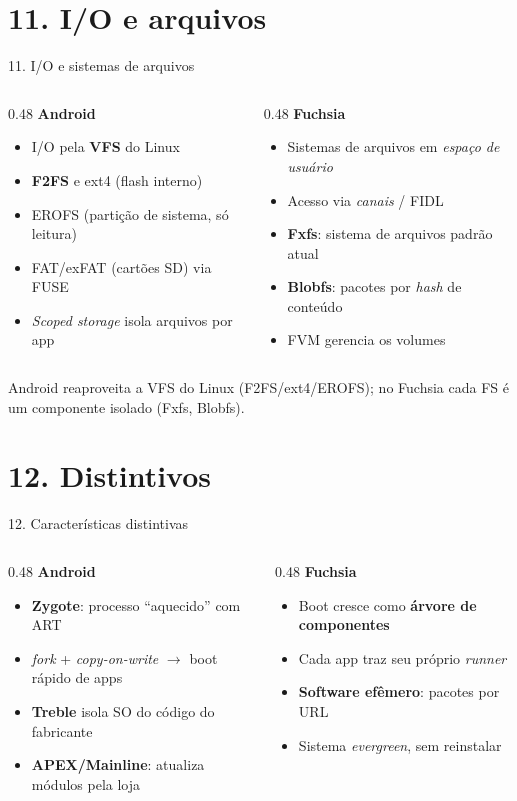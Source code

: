 \documentclass[aspectratio=169,11pt]{beamer}
\newcommand{\ANDROID}{\textbf{\color{androidVerde}Android}}
\newcommand{\FUCHSIA}{\textbf{\color{fuchsiaCor}Fuchsia}}
\newcommand{\comparar}[2]{%
  \begin{columns}[T,onlytextwidth]
    \begin{column}{0.48\textwidth}
      \ANDROID\par\smallskip
      \begin{itemize}\footnotesize #1 \end{itemize}
    \end{column}
    \begin{column}{0.48\textwidth}
      \FUCHSIA\par\smallskip
      \begin{itemize}\footnotesize #2 \end{itemize}
    \end{column}
  \end{columns}%
}
\begin{document}
\section{11. I/O e arquivos}

\begin{frame}{11. I/O e sistemas de arquivos}
  \comparar{
    \item I/O pela \textbf{VFS} do Linux
    \item \textbf{F2FS} e ext4 (flash interno)
    \item EROFS (partição de sistema, só leitura)
    \item FAT/exFAT (cartões SD) via FUSE
    \item \emph{Scoped storage} isola arquivos por app
  }{
    \item Sistemas de arquivos em \emph{espaço de usuário}
    \item Acesso via \emph{canais} / FIDL
    \item \textbf{Fxfs}: sistema de arquivos padrão atual
    \item \textbf{Blobfs}: pacotes por \emph{hash} de conteúdo
    \item FVM gerencia os volumes
  }
  \vfill
  {\scriptsize\color{gray} Android reaproveita a VFS do Linux (F2FS/ext4/EROFS); no Fuchsia cada FS é um componente isolado (Fxfs, Blobfs).}
\end{frame}

\section{12. Distintivos}

\begin{frame}{12. Características distintivas}
  \comparar{
    \item \textbf{Zygote}: processo ``aquecido'' com ART
    \item \emph{fork} + \emph{copy-on-write} $\rightarrow$ boot rápido de apps
    \item \textbf{Treble} isola SO do código do fabricante
    \item \textbf{APEX/Mainline}: atualiza módulos pela loja
  }{
    \item Boot cresce como \textbf{árvore de componentes}
    \item Cada app traz seu próprio \emph{runner}
    \item \textbf{Software efêmero}: pacotes por URL
    \item Sistema \emph{evergreen}, sem reinstalar
  }
\end{frame}
\end{document}
